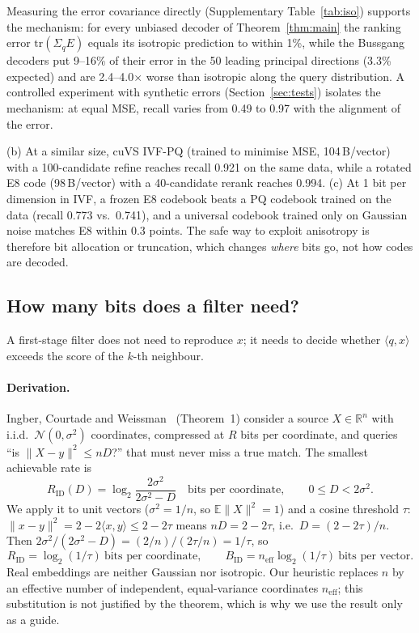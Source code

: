 \documentclass[fleqn,10pt]{wlscirep}
\begin{document}
Measuring the error covariance directly (Supplementary Table~\ref{tab:iso}) supports the mechanism: for every unbiased decoder of Theorem~\ref{thm:main} the ranking error $\mathrm{tr}(\Sigma_qE)$ equals its isotropic prediction to within 1\%, while the Bussgang decoders put 9--16\% of their error in the 50 leading principal directions (3.3\% expected) and are 2.4--4.0$\times$ worse than isotropic along the query distribution. A controlled experiment with synthetic errors (Section~\ref{sec:tests}) isolates the mechanism: at equal MSE, recall varies from 0.49 to 0.97 with the alignment of the error.

(b) At a similar size, cuVS IVF-PQ (trained to minimise MSE, 104\,B/vector) with a 100-candidate refine reaches recall 0.921 on the same data, while a rotated E8 code (98\,B/vector) with a 40-candidate rerank reaches 0.994. (c) At 1 bit per dimension in IVF, a frozen E8 codebook beats a PQ codebook trained on the data (recall 0.773 vs.\ 0.741), and a universal codebook trained only on Gaussian noise matches E8 within 0.3 points. The safe way to exploit anisotropy is therefore bit allocation or truncation, which changes \emph{where} bits go, not how codes are decoded.

\subsection{How many bits does a filter need?}\label{sec:ident}
A first-stage filter does not need to reproduce $x$; it needs to decide whether $\langle q,x\rangle$ exceeds the score of the $k$-th neighbour.

\paragraph{Derivation.} Ingber, Courtade and Weissman~\cite{ingber2015identification} (Theorem~1) consider a source $X\in\mathbb{R}^n$ with i.i.d.\ $\mathcal{N}(0,\sigma^2)$ coordinates, compressed at $R$ bits per coordinate, and queries ``is $\|X-y\|^2\le nD$?'' that must never miss a true match. The smallest achievable rate is
\[
R_{\mathrm{ID}}(D)=\log_2\frac{2\sigma^2}{2\sigma^2-D}\quad\text{bits per coordinate},\qquad 0\le D<2\sigma^2 .
\]
We apply it to unit vectors ($\sigma^2=1/n$, so $\mathbb{E}\|X\|^2=1$) and a cosine threshold $\tau$: $\|x-y\|^2=2-2\langle x,y\rangle\le 2-2\tau$ means $nD=2-2\tau$, i.e.\ $D=(2-2\tau)/n$. Then $2\sigma^2/(2\sigma^2-D)=(2/n)/(2\tau/n)=1/\tau$, so
\[
R_{\mathrm{ID}}=\log_2(1/\tau)\ \text{bits per coordinate},\qquad B_{\mathrm{ID}}=n_{\mathrm{eff}}\log_2(1/\tau)\ \text{bits per vector}.
\]
Real embeddings are neither Gaussian nor isotropic. Our heuristic replaces $n$ by an effective number of independent, equal-variance coordinates $n_{\mathrm{eff}}$; this substitution is not justified by the theorem, which is why we use the result only as a guide.
\end{document}
